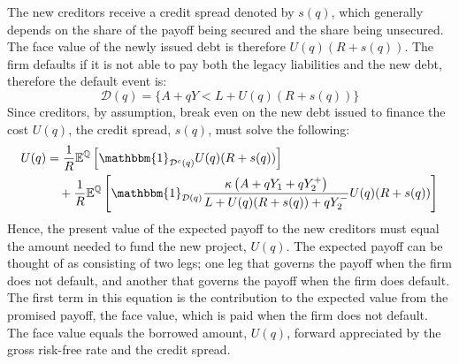 \documentclass[../main.tex]{subfiles}
\begin{document}
        The new creditors receive a credit spread denoted by $s(q)$,
        which generally depends on the share of the payoff being secured and the share being unsecured.
        The face value of the newly issued debt is therefore $U(q)(R + s(q))$.
        The firm defaults if it is not able to pay both the legacy liabilities and the new debt,
        therefore the default event is:
            \begin{equation*}
                \mathcal{D}(q)
                = 
                \{
                    A + qY < L + U(q)(R + s(q))
                \}
            \end{equation*}
        Since creditors, by assumption, break even on the new debt issued to finance the cost $U(q)$,
        the credit spread, $s(q)$, must solve the following:
            \begin{align}
                    U(q) 
                &=
                    \discountfactor
                    \mathbb{E}^{\rnmeasure}\left[
                        \mathbbm{1}_{\mathcal{D}^{c}(q)}
                        U(q)
                        (\grossrfrate + s(q))
                    \right]
                \nonumber \\
                &\quad+
                    \discountfactor
                    \mathbb{E}^{\rnmeasure}\left[
                        \mathbbm{1}_{\mathcal{D}(q)}
                        \frac{
                            \kappa 
                            \left(
                                A + q Y_{1} + q Y_{2}^{+}
                            \right)
                        }{
                            L 
                            +
                            U(q)
                            (\grossrfrate + s(q))
                            +
                            q Y_{2}^{-} 
                        } 
                        U(q)
                        (\grossrfrate + s(q))    
                    \right] 
                \label{eqn:new-creditors-breakeven}
            \end{align}
        Hence, the present value of the expected payoff to the new creditors
        must equal the amount needed to fund the new project, $U(q)$. 
        The expected payoff can be thought of as consisting of two legs;
        one leg that governs the payoff when the firm does not default, 
        and another that governs the payoff when the firm does default. 
        The first term in this equation is the contribution to the expected value from the promised payoff,
        the face value, which is paid when the firm does not default. 
        The face value equals the borrowed amount, $U(q)$, 
        forward appreciated by the gross risk-free rate and the credit spread.
        
\end{document}
